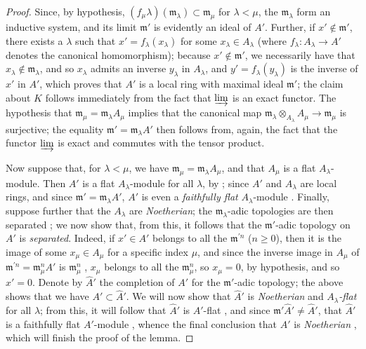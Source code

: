 \begin{proof}
\label{proof-0.10.3.1.3}
Since, by hypothesis, $(f_\mu\lambda)(\mathfrak{m}_\lambda)\subset\mathfrak{m}_\mu$ for $\lambda<\mu$, the $\mathfrak{m}_\lambda$ form an inductive system, and its limit $\mathfrak{m}'$ is evidently an ideal of $A'$.
Further, if $x'\not\in\mathfrak{m}'$, there exists a $\lambda$ such that $x'=f_\lambda(x_\lambda)$ for some $x_\lambda\in A_\lambda$ (where $f_\lambda:A_\lambda\to A'$ denotes the canonical homomorphism);
because $x'\not\in\mathfrak{m}'$, we necessarily have that $x_\lambda\not\in\mathfrak{m}_\lambda$, and so $x_\lambda$ admits an inverse $y_\lambda$ in $A_\lambda$, and $y'=f_\lambda(y_\lambda)$ is the inverse of $x'$ in $A'$, which proves that $A'$ is a local ring with maximal ideal $\mathfrak{m}'$;
the claim about $K$ follows immediately from the fact that $\varinjlim$ is an exact functor.
The hypothesis that $\mathfrak{m}_\mu=\mathfrak{m}_\lambda A_\mu$ implies that the canonical map $\mathfrak{m}_\lambda\otimes_{A_\lambda}A_\mu\to\mathfrak{m}_\mu$ is surjective;
the equality $\mathfrak{m}'=\mathfrak{m}_\lambda A'$ then follows from, again, the fact that the functor $\varinjlim$ is exact and commutes with the tensor product.

Now suppose that, for $\lambda<\mu$, we have $\mathfrak{m}_\mu=\mathfrak{m}_\lambda A_\mu$, and that $A_\mu$ is a flat $A_\lambda$-module.
Then $A'$ is a flat $A_\lambda$-module for all $\lambda$, by ;
since $A'$ and $A_\lambda$ are local rings, and since $\mathfrak{m}'=\mathfrak{m}_\lambda A'$, $A'$ is even a \emph{faithfully flat} $A_\lambda$-module .
Finally, suppose further that the $A_\lambda$ are \emph{Noetherian};
the $\mathfrak{m}_\lambda$-adic topologies are then separated ;
we now show that, from this, it follows that the $\mathfrak{m}'$-adic topology on $A'$ is \emph{separated}.
Indeed, if $x'\in A'$ belongs to all the $\mathfrak{m}^{'n}$ ($n\geq0$), then it is the image of some $x_\mu\in A_\mu$ for a specific index $\mu$, and since the inverse image in $A_\mu$ of $\mathfrak{m}^{'n}=\mathfrak{m}_\mu^n A'$ is $\mathfrak{m}_\mu^n$ , $x_\mu$ belongs to all the $\mathfrak{m}_\mu^n$, so $x_\mu=0$, by hypothesis, and so $x'=0$.
Denote by $\widehat{A}'$ the completion of $A'$ for the $\mathfrak{m}'$-adic topology;
the above shows that we have $A'\subset\widehat{A}'$.
We will now show that $\widehat{A}'$ is \emph{Noetherian} and \emph{$A_\lambda$-flat} for all $\lambda$;
from this,
it will follow that $\widehat{A}'$ is $A'$-flat , and since $\mathfrak{m}'\widehat{A}'\neq\widehat{A}'$, that $\widehat{A}'$ is a faithfully flat $A'$-module , whence the final conclusion that $A'$ is \emph{Noetherian} , which will finish the proof of the lemma.


\end{proof}
